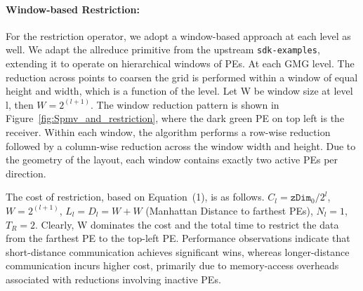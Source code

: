 \documentclass[conference]{IEEEtran}
\begin{document}
            \paragraph{Window-based Restriction:}
            For the restriction operator, we adopt a window-based approach at each level as well.  We adapt the
            allreduce primitive from the upstream \texttt{sdk-examples}, extending it to operate on hierarchical windows of PEs. At each GMG level. The reduction across points to coarsen the grid is performed within a window of equal height and width, which is a function of the level. Let W be window size at level l, then \(W = 2^{(l+1)}\). The window reduction pattern is shown in Figure~\ref{fig:Spmv_and_restriction}, where the dark green PE on top left is the receiver. Within each window, the algorithm performs a row-wise reduction followed by a column-wise reduction across the window width and height. Due to the geometry of the layout, each window contains exactly two active PEs per direction.

            The cost of restriction, based on Equation~(1), is as follows.
            \(C_l = \texttt{zDim}_0/2^l\), \(W = 2^{(l+1)}\), \(L_l = D_l = W + W\)
            (Manhattan Distance to farthest PEs), \(N_l = 1\), \(T_R = 2\).
            Clearly, W dominates the cost and the total time to restrict the data from the farthest PE to the top-left PE. Performance observations indicate that short-distance communication achieves significant wins, whereas longer-distance communication incurs higher cost, primarily due to memory-access overheads associated with reductions involving inactive PEs. %
\end{document}
